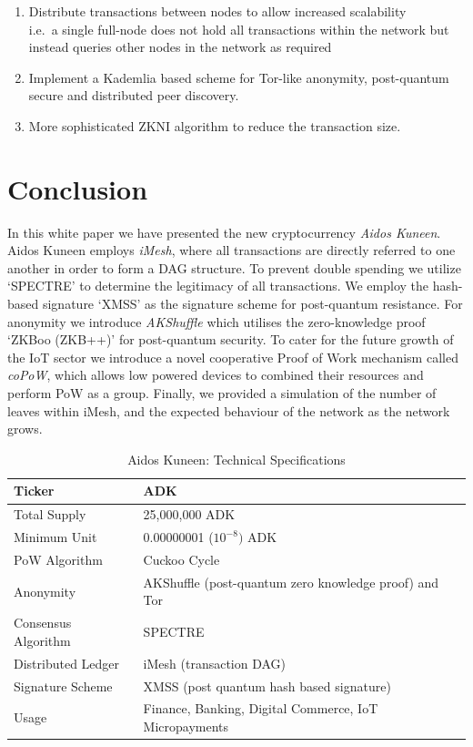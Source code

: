\documentclass[a4paper,10pt,twocolumn]{article}
\begin{document}
	\vspace{-0.5\baselineskip}
	\begin{enumerate}
		\setlength\itemsep{0em}
	\item  Distribute transactions between nodes to allow increased scalability\\
	i.e.\ a single full-node does not hold all transactions 
	 within the network but instead queries other nodes in the network as required
	\item Implement a Kademlia based scheme for Tor-like anonymity, post-quantum secure and distributed peer discovery.
	\item More sophisticated ZKNI algorithm to reduce the transaction size.
	\end{enumerate}

	  \section{Conclusion}
\label{sec:conc}

In this white paper we have presented the new cryptocurrency \emph{Aidos Kuneen}.
Aidos Kuneen employs \emph{iMesh}, where all transactions are directly referred to one another in order to form a DAG structure.
To prevent double spending we utilize `SPECTRE' to determine the legitimacy of all transactions.
We employ the hash-based signature `XMSS' as the signature scheme for post-quantum resistance.
For anonymity we introduce \emph{AKShuffle} which utilises the zero-knowledge proof `ZKBoo (ZKB++)' for post-quantum security.
To cater for the future growth of the IoT sector we introduce a novel cooperative Proof of Work mechanism called \emph{coPoW}, which allows low powered devices to combined their resources and perform PoW as a group.
Finally, we provided a simulation of the number of leaves within iMesh, and the expected behaviour of the network as the network grows.

\begin{table}[htb]
	\caption{Aidos Kuneen: Technical Specifications}
    \label{tbl:spec}
	\begin{tabularx}{\linewidth}{XX} 
		\toprule
		Ticker & ADK \\
		\midrule
Total Supply & 25,000,000 ADK \\ 
\midrule
Minimum Unit & 0.00000001 (\(10^{-8})\) ADK \\ 
\midrule
PoW Algorithm & Cuckoo Cycle\\ 
\midrule
Anonymity & AKShuffle (post-quantum zero knowledge proof) and Tor \\
\midrule
Consensus Algorithm & SPECTRE \\ \midrule
Distributed Ledger & iMesh (transaction DAG) \\
\midrule
Signature Scheme & XMSS (post quantum hash based signature)\\ 
\midrule
Usage &  Finance, Banking, Digital Commerce, IoT Micropayments \\ 
\bottomrule
\end{tabularx}
  \end{table}
\end{document}
